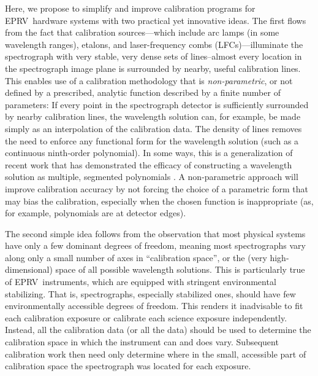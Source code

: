 \documentclass[twocolumn,table,xcolor,trackchanges]{aastex63}
\newcommand{\acronym}[1]{{\small{#1}}}
\newcommand{\eprv}{\acronym{EPRV}}
\newcommand{\lfc}{\acronym{LFC}}
\begin{document}
Here, we propose to simplify and improve calibration programs for \eprv\ hardware systems with two practical yet innovative ideas.  The first flows from the fact that calibration sources---which include arc lamps (in some wavelength ranges), etalons, and laser-frequency combs (\lfc s)---illuminate the spectrograph with very stable, very dense sets of lines--almost every location in the spectrograph image plane is surrounded by nearby, useful calibration lines.  This enables use of a calibration methodology that is \emph{non-parametric}, or not defined by a prescribed, analytic function described by a finite number of parameters:  If every point in the spectrograph detector is sufficiently surrounded by nearby calibration lines, the wavelength solution can, for example, be made simply as an interpolation of the calibration data.  The density of lines removes the need to enforce any functional form for the wavelength solution (such as a continuous ninth-order polynomial).  In some ways, this is a generalization of recent work that has demonstrated the efficacy of constructing a wavelength solution as multiple, segmented polynomials \citep{milakovic2020}.  A non-parametric approach will improve calibration accuracy by not forcing the choice of a parametric form that may bias the calibration, especially when the chosen function is inappropriate (as, for example, polynomials are at detector edges).

The second simple idea follows from the observation that most physical systems have only a few dominant degrees of freedom, meaning most spectrographs vary along only a small number of axes in ``calibration space'', or the (very high-dimensional) space of all possible wavelength solutions.  This is particularly true of \eprv\ instruments, which are equipped with stringent environmental stabilizing.    That is, spectrographs, especially stabilized ones, should have few environmentally accessible degrees of freedom.  This renders it inadvisable to fit each calibration exposure or calibrate each science exposure independently.  Instead, all the calibration data (or all the data) should be used to determine the calibration space in which the instrument can and does vary.  Subsequent calibration work then need only determine where in the small, accessible part of calibration space the spectrograph was located for each exposure.
\end{document}
